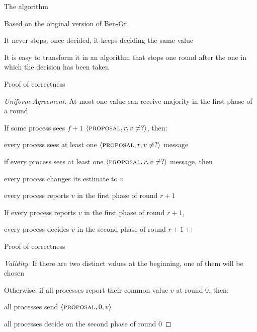 \begin{frame}{The algorithm}
\BIL
\item Based on the original version of Ben-Or
\item It never stops; once decided, it keeps deciding the same value
\item It is easy to transform it in an algorithm that stops one round after
the one in which the decision has been taken
\EIL
\end{frame}

\begin{frame}{Proof of correctness}
	
\begin{proof}[Uniform Agreement]
\BIL
\item At most one value can receive majority in the first phase of a round
\item If some process sees $f+1$ $\langle \textsc{proposal}, r, v \neq ? \rangle$, then:
\BI 
\item every process sees at least one $\langle \textsc{proposal}, r, v \neq ? \rangle$ message
\EI
\item if every process sees at least one $\langle \textsc{proposal}, r, v \neq ? \rangle$ message, then
\BI 
\item every process changes its estimate to $v$
\item every process reports $v$ in the first phase of round $r+1$
\EI
\item If every process reports $v$ in the first phase of round $r+1$,
\BI
\item every process decides $v$ in the second phase of round $r+1$
\EI
\EIL
\end{proof}

\end{frame}


\begin{frame}{Proof of correctness}
\begin{proof}[Validity]
\BIL
\item If there are two distinct values at the beginning, one of them will be chosen
\item Otherwise, if all processes report their common value $v$ at round $0$, then:
\BI
  \item all processes send $\langle \textsc{proposal}, 0, v \rangle$
  \item all processes decide on the second phase of round $0$
\EI
\EIL
\end{proof}
\end{frame}

